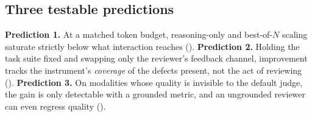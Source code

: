 \subsection{Three testable predictions}
\label{sec:predictions}

\textbf{Prediction 1.} At a matched token budget, reasoning-only and best-of-$N$ scaling saturate strictly below what interaction reaches (). \textbf{Prediction 2.} Holding the task suite fixed and swapping only the reviewer's feedback channel, improvement tracks the instrument's \emph{coverage} of the defects present, not the act of reviewing (). \textbf{Prediction 3.} On modalities whose quality is invisible to the default judge, the gain is only detectable with a grounded metric, and an ungrounded reviewer can even regress quality ().
